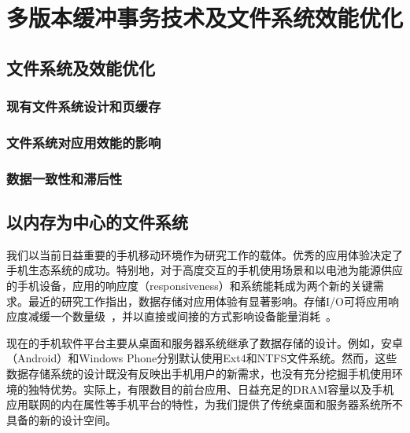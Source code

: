 \chapter{多版本缓冲事务技术及文件系统效能优化}
\label{chap:vct}

\section{文件系统及效能优化}

\subsection{现有文件系统设计和页缓存}

\subsection{文件系统对应用效能的影响}

\subsection{数据一致性和滞后性}

\section{以内存为中心的文件系统}

我们以当前日益重要的手机移动环境作为研究工作的载体。优秀的应用体验决定了手机生态系统的成功。特别地，对于高度交互的手机使用场景和以电池为能源供应的手机设备，应用的响应度（responsiveness）和系统能耗成为两个新的关键需求。最近的研究工作指出，数据存储对应用体验有显著影响。存储I/O可将应用响应度减缓一个数量级~\cite{Desnoyers:2013:SRN:2534861.2534867, Kim:RSS:2012,Lee:2012:SLD:2380356.2380367, Nguyen:2014:ISR:2638728.2638841}，并以直接或间接的方式影响设备能量消耗~\cite{Li:2014:EOM:2591305.2591316,Nguyen:2013:SSE:2493432.2493505,
Xu:2013:OBE:2462456.2464444}。

现在的手机软件平台主要从桌面和服务器系统继承了数据存储的设计。例如，安卓（Android）和Windows Phone分别默认使用Ext4和NTFS文件系统。然而，这些数据存储系统的设计既没有反映出手机用户的新需求，也没有充分挖掘手机使用环境的独特优势。实际上，有限数目的前台应用、日益充足的DRAM容量以及手机应用联网的内在属性等手机平台的特性，为我们提供了传统桌面和服务器系统所不具备的新的设计空间。

